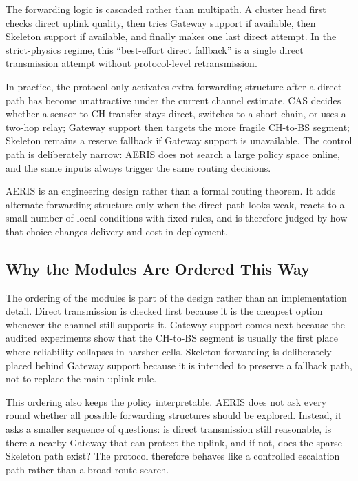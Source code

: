\documentclass[conference]{IEEEtran}
\begin{document}
The forwarding logic is cascaded rather than multipath. A cluster head first checks direct uplink quality, then tries Gateway support if available, then Skeleton support if available, and finally makes one last direct attempt. In the strict-physics regime, this ``best-effort direct fallback'' is a single direct transmission attempt without protocol-level retransmission.

In practice, the protocol only activates extra forwarding structure after a direct path has become unattractive under the current channel estimate. CAS decides whether a sensor-to-CH transfer stays direct, switches to a short chain, or uses a two-hop relay; Gateway support then targets the more fragile CH-to-BS segment; Skeleton remains a reserve fallback if Gateway support is unavailable. The control path is deliberately narrow: AERIS does not search a large policy space online, and the same inputs always trigger the same routing decisions.

AERIS is an engineering design rather than a formal routing theorem. It adds alternate forwarding structure only when the direct path looks weak, reacts to a small number of local conditions with fixed rules, and is therefore judged by how that choice changes delivery and cost in deployment.

\subsection{Why the Modules Are Ordered This Way}
The ordering of the modules is part of the design rather than an implementation detail. Direct transmission is checked first because it is the cheapest option whenever the channel still supports it. Gateway support comes next because the audited experiments show that the CH-to-BS segment is usually the first place where reliability collapses in harsher cells. Skeleton forwarding is deliberately placed behind Gateway support because it is intended to preserve a fallback path, not to replace the main uplink rule.

This ordering also keeps the policy interpretable. AERIS does not ask every round whether all possible forwarding structures should be explored. Instead, it asks a smaller sequence of questions: is direct transmission still reasonable, is there a nearby Gateway that can protect the uplink, and if not, does the sparse Skeleton path exist? The protocol therefore behaves like a controlled escalation path rather than a broad route search.
\end{document}
